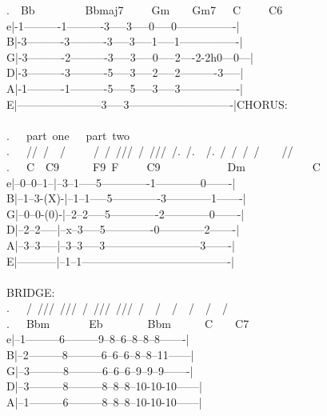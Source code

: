 {.\ \ Bb\ \ \ \ \ \ \ \ \ Bbmaj7\ \ \ \ \ Gm\ \ \ \ Gm7\ \ \ C\ \ \ \ \ C6\ \ \\
e|-1----------1----------3-----3-----0-----0----------------|\\
B|-3----------3----------3-----3-----1-----1----------------|\\
G|-3----------2----------3-----3-----0-----2----2-2h0---0---|\\
D|-3----------3----------5-----3-----2-----2----------3-----|\\
A|-1----------1----------5-----5-----3-----3----------------|\\
E|-----------------------3-----3----------------------------|CHORUS:\\
\\
.\ \ \ part\ one\ \ \ part\ two\\
.\ \ \ //\ /\ \ /\ \ \ \ \ /\ /\ ///\ /\ ///\ /.\ /.\ \ /.\ /\ /\ /\ /\ \ \ \ //\\
.\ \ \ C\ \ C9\ \ \ \ \ \ F9\ F\ \ \ \ \ C9\ \ \ \ \ \ \ \ \ \ \ \ Dm\ \ \ \ \ \ \ \ \ \ \ \ C\\
e|--0--0--1--|--3--1-----5-------------1------------0-------|\\
B|--1--3-(X)-|--1--1-----5-------------3------------1-------|\\
G|--0--0-(0)-|--2--2-----5-------------2------------0-------|\\
D|--2--2-----|--x--3-----5-------------0------------2-------|\\
A|--3--3-----|--3--3-----3--------------------------3-------|\\
E|-----------|--1--1----------------------------------------|\\
\\
BRIDGE:\ \ \ \ \ \ \ \ \ \ \ \ \ \ \ \ \ \ \ \ \ \ \ \ \ \ \ \ \ \ \ \ \ \ \ \ \ \ \ \ \ \ \\
.\ \ \ /\ ///\ ///\ /\ ///\ ///\ /\ \ /\ \ /\ \ /\ \ /\ \ /\ \ \ \ \ \ \ \ \ \ \ \\
.\ \ \ Bbm\ \ \ \ \ \ \ Eb\ \ \ \ \ \ \ \ Bbm\ \ \ \ \ \ C\ \ \ \ C7\ \ \ \ \ \ \ \ \ \ \ \ \ \\
e|--1---------6---------9--8--6--8--8--8-------|\ \\
B|--2---------8---------6--6--6--8--8--11------|\ \\
G|--3---------8---------6--6--6--9--9--9-------|\ \\
D|--3---------8---------8--8--8--10-10-10------|\ \\
A|--1---------6---------8--8--8--10-10-10------|\ \\
}
